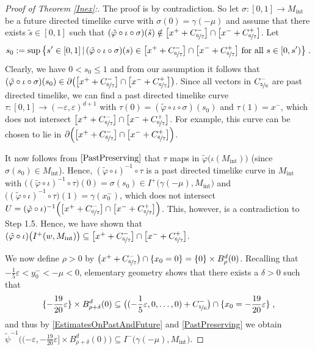 \documentclass[reqno]{article}
\newcommand{\ed}{(-\varepsilon, \varepsilon)^{d+1}}
\newcommand{\Mint}{M_{\mathrm{int}}}
\begin{document}
\begin{proof}[Proof of Theorem \ref{Inex}:]
The proof is by contradiction. So let $\sigma : [0,1] \to \Mint$ be a future directed timelike curve with $\sigma(0) = \gamma(-\mu)$ and assume that there exists $\tilde{s} \in [0,1]$ such that $(\tilde{\varphi} \circ \iota \circ \sigma)(\tilde{s}) \notin \big[x^+ + C^-_{\nicefrac{6}{7}}\big] \cap \big[x^- + C^+_{\nicefrac{6}{7}}\big]$. Let
\begin{equation*}
s_0 := \sup \big{\{}s' \in [0,1] \, | \, (\tilde{\varphi} \circ \iota \circ \sigma)(s) \in \big[x^+ + C^-_{\nicefrac{6}{7}}\big] \cap \big[x^- + C^+_{\nicefrac{6}{7}}\big] \textnormal{ for all } s \in [0,s')\big{\}} \;.
\end{equation*}
Clearly, we have $0 < s_0 \leq 1$ and from our assumption it follows that $(\tilde{\varphi} \circ \iota \circ \sigma)(s_0)  \in \partial \big(\big[x^+ + C^-_{\nicefrac{6}{7}}\big] \cap \big[x^- + C^+_{\nicefrac{6}{7}}\big]\big)$. 
Since all vectors in $C^-_{\nicefrac{5}{6}}$ are past directed timelike, we can find a past directed timelike curve $\tau : [0,1] \to \ed$ with $\tau(0) = (\tilde{\varphi} \circ \iota \circ \sigma) (s_0)$ and $\tau(1) = x^-$, which does not intersect $\big[x^+ + C^-_{\nicefrac{6}{7}}\big] \cap \big[x^- + C^+_{\nicefrac{6}{7}}\big]$. For example, this curve can be chosen to lie in $\partial \Big(\big[x^+ + C^-_{\nicefrac{6}{7}}\big] \cap \big[x^- + C^+_{\nicefrac{6}{7}}\big]\Big)$.
\begin{center}
\def\svgwidth{12cm}

\end{center}
It now follows from $\eqref{PastPreserving}$ that $\tau$ maps in $\tilde{\varphi}\big(\iota(\Mint)\big)$ (since $\sigma(s_0) \in \Mint$). Hence, $(\tilde{\varphi} \circ \iota)^{-1} \circ \tau$ is a past directed timelike curve in $\Mint$ with $\big((\tilde{\varphi} \circ \iota)^{-1} \circ \tau\big)(0) = \sigma(s_0) \in I^+\big(\gamma(-\mu),\Mint\big)$ and $\big((\tilde{\varphi} \circ \iota)^{-1} \circ \tau\big)(1) =\gamma(x^-_0)$, which does not intersect $U= (\tilde{\varphi} \circ \iota)^{-1}\Big(\big[x^+ + C^-_{\nicefrac{6}{7}}\big] \cap \big[x^- + C^+_{\nicefrac{6}{7}}\big]\Big)$. This, however, is a contradiction to Step 1.5. Hence, we have shown that $(\tilde{\varphi} \circ \iota) \big(I^+(w, \Mint)\big) \subseteq  \big[x^+ + C^-_{\nicefrac{6}{7}}\big] \cap \big[x^- + C^+_{\nicefrac{6}{7}}\big]$. 

We now define $\rho >0$ by $\big(x^+ + C^-_{\nicefrac{6}{7}}\big) \cap \{x_0 = 0\} = \{0\} \times B^d_\rho(0)$.
Recalling that $-\frac{1}{5} \varepsilon < y_0^- < -\mu < 0$, elementary geometry shows that there exists a $\delta >0$ such that
\begin{equation*}
\{-\frac{19}{20} \varepsilon\} \times B^d_{\rho + \delta}(0) \subseteq \big((-\frac{1}{5}\varepsilon, 0, \ldots, 0) + C^-_{\nicefrac{5}{6}}\big) \cap \{x_0 = -\frac{19}{20} \varepsilon\} \;,
\end{equation*}
and thus by  \eqref{EstimatesOnPastAndFuture} and \eqref{PastPreserving} we obtain $\tilde{\psi}^{-1} \Big((-\varepsilon, - \frac{19}{20} \varepsilon] \times B^d_{\rho + \delta}(0) \Big) \subseteq I^-\big(\gamma(-\mu), \Mint\big)$.


\end{proof}
\end{document}
